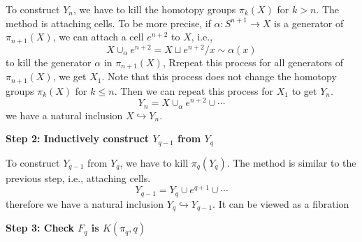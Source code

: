     To construct $Y_n$, we have to 
    kill the homotopy groups $\pi_k(X)$ for $k>n$. 
    The method is attaching cells.
    To be more precise, if $\alpha: S^{n+1} \to X$ is a generator of 
    $\pi_{n+1}(X)$, we can attach a cell $e^{n+2}$ to $X$, i.e.,
    \begin{equation*}
        X \cup_{\alpha} e^{n+2} = X \sqcup e^{n+2} \big/ x\sim \alpha(x)
    \end{equation*}
    to kill the generator $\alpha$ in $\pi_{n+1}(X)$,
    Rrepeat this process for all generators of $\pi_{n+1}(X)$, we get $X_1$. 
    Note that this process does not change the homotopy groups
    $\pi_k(X)$ for $k\leq n$. 
    Then we can repeat this process for $X_1$ to get $Y_n$.
    \begin{equation*}
        Y_n = X \cup_{\alpha} e^{n+2} \cup \cdots
    \end{equation*}
    we have a natural inclusion $X \hookrightarrow Y_n$.

    \textbf{Step 2: Inductively construct $Y_{q-1}$ from $Y_q$}

    To construct $Y_{q-1}$ from $Y_q$, we have to kill $\pi_q(Y_q)$. 
    The method is similar to the previous step, i.e., attaching cells.
    \begin{equation*}
        Y_{q-1} = Y_q \cup e^{q+1} \cup \cdots
    \end{equation*}
    therefore we have a natural inclusion $Y_q \hookrightarrow Y_{q-1}$. 
    It can be viewed as a fibration 
    \begin{center}
    \end{center}

    \textbf{Step 3: Check $F_q$ is $K(\pi_q,q)$}

